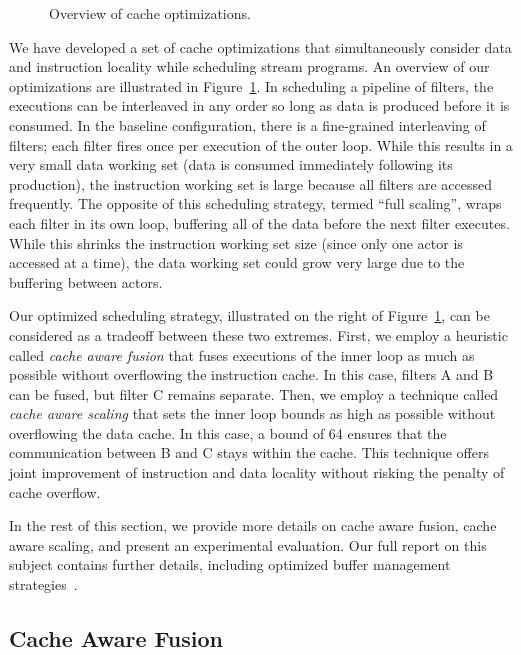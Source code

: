 \begin{figure}[t]
\caption{Overview of cache optimizations.\protect\label{fig:cacheopt}}
\end{figure}

We have developed a set of cache optimizations that simultaneously
consider data and instruction locality while scheduling stream
programs.  An overview of our optimizations are illustrated in
Figure~\ref{fig:cacheopt}.  In scheduling a pipeline of filters, the
executions can be interleaved in any order so long as data is produced
before it is consumed.  In the baseline configuration, there is a
fine-grained interleaving of filters; each filter fires once per
execution of the outer loop.  While this results in a very small data
working set (data is consumed immediately following its production),
the instruction working set is large because all filters are accessed
frequently.  The opposite of this scheduling strategy, termed ``full
scaling'', wraps each filter in its own loop, buffering all of the
data before the next filter executes.  While this shrinks the
instruction working set size (since only one actor is accessed at a
time), the data working set could grow very large due to the buffering
between actors.

Our optimized scheduling strategy, illustrated on the right of
Figure~\ref{fig:cacheopt}, can be considered as a tradeoff between
these two extremes.  First, we employ a heuristic called {\it cache
aware fusion} that fuses executions of the inner loop as much as
possible without overflowing the instruction cache.  In this case,
filters A and B can be fused, but filter C remains separate.  Then, we
employ a technique called {\it cache aware scaling} that sets the
inner loop bounds as high as possible without overflowing the data
cache.  In this case, a bound of 64 ensures that the communication
between B and C stays within the cache.  This technique offers joint
improvement of instruction and data locality without risking the
penalty of cache overflow.

In the rest of this section, we provide more details on cache aware
fusion, cache aware scaling, and present an experimental evaluation.
Our full report on this subject contains further details, including
optimized buffer management
strategies~\cite{sermulins:lctes:2005,sermulins-thesis}.

\subsection*{Cache Aware Fusion}

